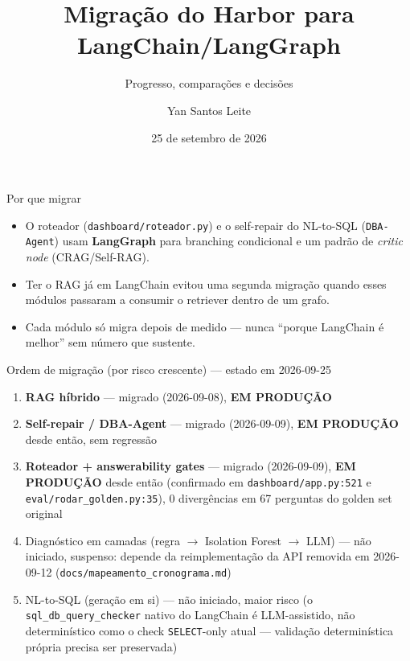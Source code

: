 \documentclass{beamer}
\title{Migração do Harbor para LangChain/LangGraph}
\subtitle{Progresso, comparações e decisões}
\author{Yan Santos Leite}
\date{25 de setembro de 2026}
\begin{document}
\frame{\titlepage}

\begin{frame}{Por que migrar}
  \begin{itemize}
    \item O roteador (\texttt{dashboard/roteador.py}) e o self-repair do NL-to-SQL
      (\texttt{DBA-Agent}) usam \textbf{LangGraph} para branching condicional e um padrão
      de \emph{critic node} (CRAG/Self-RAG).
    \item Ter o RAG já em LangChain evitou uma segunda migração quando esses módulos
      passaram a consumir o retriever dentro de um grafo.
    \item Cada módulo só migra depois de medido — nunca ``porque LangChain é melhor'' sem
      número que sustente.
  \end{itemize}
\end{frame}

\begin{frame}{Ordem de migração (por risco crescente) — estado em 2026-09-25}
  \begin{enumerate}
    \item \textbf{RAG híbrido} — \alert{migrado} (2026-09-08), \textbf{EM PRODUÇÃO}
    \item \textbf{Self-repair / DBA-Agent} — \alert{migrado} (2026-09-09), \textbf{EM
      PRODUÇÃO} desde então, sem regressão
    \item \textbf{Roteador + answerability gates} — \alert{migrado} (2026-09-09),
      \textbf{EM PRODUÇÃO} desde então (confirmado em \texttt{dashboard/app.py:521} e
      \texttt{eval/rodar\_golden.py:35}), 0 divergências em 67 perguntas do golden set
      original
    \item Diagnóstico em camadas (regra $\to$ Isolation Forest $\to$ LLM) — não iniciado,
      suspenso: depende da reimplementação da API removida em 2026-09-12
      (\texttt{docs/mapeamento\_cronograma.md})
    \item NL-to-SQL (geração em si) — não iniciado, maior risco (o
      \texttt{sql\_db\_query\_checker} nativo do LangChain é LLM-assistido, não
      determinístico como o check \texttt{SELECT}-only atual — validação determinística
      própria precisa ser preservada)
  \end{enumerate}
\end{frame}
\end{document}
